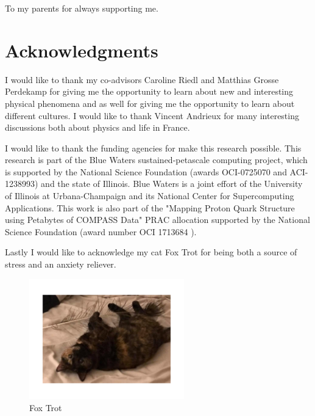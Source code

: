 \documentclass[edeposit,fullpage]{Classes/uiucthesis2009}
\begin{document}
\begin{dedication}
To my parents for always supporting me.
\end{dedication}

\chapter*{Acknowledgments}
I would like to thank my co-advisors Caroline Riedl and Matthias Grosse
Perdekamp for giving me the opportunity to learn about new and interesting
physical phenomena and as well for giving me the opportunity to learn about
different cultures.  I would like to thank Vincent Andrieux for many interesting
discussions both about physics and life in France.

I would like to thank the funding agencies for make this research possible.
This research is part of the Blue Waters sustained-petascale
computing project, which is supported by the National Science
Foundation (awards OCI-0725070 and ACI-1238993) and the state of
Illinois. Blue Waters is a joint effort of the University of Illinois
at Urbana-Champaign and its National Center for Supercomputing
Applications. This work is also part of the "Mapping Proton Quark
Structure using Petabytes of COMPASS Data" PRAC allocation supported
by the National Science Foundation (award number OCI 1713684 ).

Lastly I would like to acknowledge my cat Fox Trot for being both a source of 
stress and an anxiety reliever.
\begin{figure}[h!t]
  \centering
  \includegraphics[width=0.6\textwidth,trim=2cm 4cm 2cm 4cm,clip]{fox}
  \caption{Fox Trot}
  \label{fig::fox}
\end{figure}


\tableofcontents
\listoftables
\listoffigures
\end{document}
